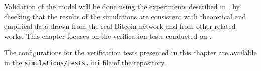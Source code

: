 Validation of the model will be done using the experiments described in
, by checking that the results of the simulations are consistent
with theoretical and empirical data drawn from the real Bitcoin network and
from other related works. This chapter focuses on the verification tests
conducted on \iblock{}.

The configurations for the verification tests presented in this
chapter are available in the \texttt{simulations/tests.ini} file of the
repository.





